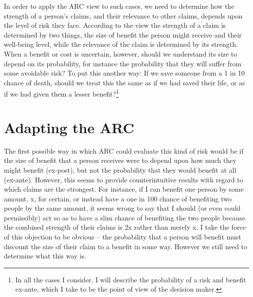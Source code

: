 \documentclass[man,11pt,a4paper]{apa7}
\begin{document}
In order to apply the ARC view to such cases, we need to determine how the strength of a person's claims, and their relevance to other claims, depends upon the level of risk they face. According to the view the strength of a claim is determined by two things, the size of benefit the person might receive and their well-being level, while the relevance of the claim is determined by its strength. When a benefit or cost is uncertain, however, should we understand its size to depend on its probability, for instance the probability that they will suffer from some avoidable risk? To put this another way: If we save someone from a 1 in 10 chance of death, should we treat this the same as if we had saved their life, or as if we had given them a lesser benefit?\footnote{In all the cases I consider, I will describe the probability of a risk and benefit ex-ante, which I take to be the point of view of the decision maker.}

\section{Adapting the ARC}

The first possible way in which ARC could evaluate this kind of risk would be if the size of benefit that a person receives were to depend upon how much they might benefit (ex-post), but not the probability that they would benefit at all (ex-ante). However, this seems to provide counterintuitive results with regard to which claims are the strongest. For instance, if I can benefit one person by some amount, x, for certain, or instead have a one in 100 chance of benefiting two people by the same amount, it seems wrong to say that I should (or even could permissibly) act so as to have a slim chance of benefiting the two people because the combined strength of their claims is 2x rather than merely x. I take the force of this objection to be obvious -- the probability that a person will benefit must discount the size of their claim to a benefit in some way. However we still need to determine what this way is.
\end{document}
